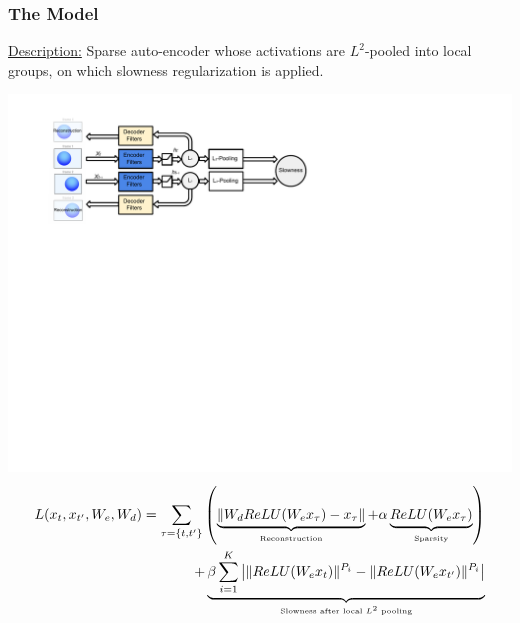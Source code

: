 \documentclass{beamer}
\begin{document}
\begin{frame}
\frametitle{The Model}
\underline{Description:} Sparse auto-encoder whose activations are $L^2$-pooled into local groups, on which slowness regularization is applied.
\begin{center} 
\includegraphics[scale=0.50,trim = 15 350 290 39, clip]{./Figures/Project1/diagram.pdf} \\
{\small
\begin{eqnarray}
\nonumber 
L(x_t,x_{t'},W_e,W_d)= \sum_{\tau = \{t,t'\}} \left(\underbrace{\|W_d ReLU(W_e x_\tau) - x_\tau\|}_{\mbox{\tiny Reconstruction}} +  \alpha \underbrace{ReLU(W_e x_\tau)}_{\mbox{\tiny Sparsity}} \right) \\
\nonumber
 + \underbrace{\beta \sum_{i=1}^K \left| \|ReLU(W_ex_t)\|^{P_i} - \|ReLU(W_ex_{t'})\|^{P_i} \right|}_{\mbox{\tiny Slowness after local $L^2$ pooling}}
\end{eqnarray}}
\end{center} 
\end{frame} 
\end{document}
